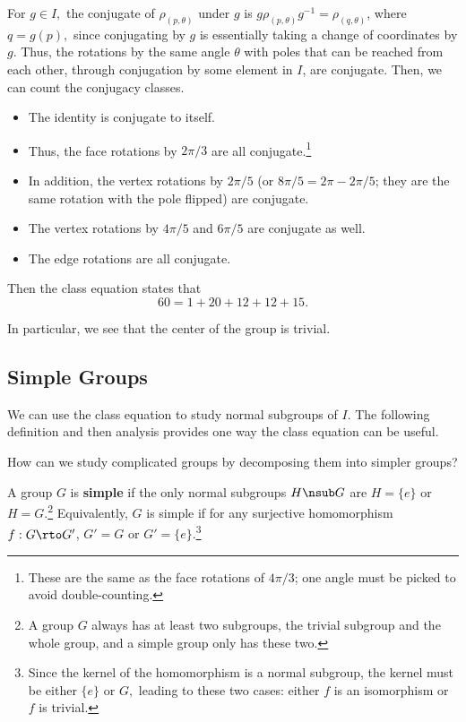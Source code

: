 For $g \in I,$ the conjugate of $\rho_{(p, \theta)}$ under $g$ is $g\rho_{(p, \theta)} g^{-1} = \rho_{(q, \theta)}$, where $q = g(p),$ since conjugating by $g$ is essentially taking a change of coordinates by $g.$ Thus, the rotations by the same angle $\theta$ with poles that can be reached from each other, through conjugation by some element in $I$, are conjugate. Then, we can count the conjugacy classes. 
\begin{itemize}
    \item The identity is conjugate to itself.
    
    \item Thus, the face rotations by $2\pi/3$ are all conjugate.\footnote{These are the same as the face rotations of $4\pi/3$; one angle must be picked to avoid double-counting.} 
    
    \item In addition, the vertex rotations by $2\pi/5$ (or $8\pi/5 = 2\pi - 2\pi/5$; they are the same rotation with the pole flipped) are conjugate.
    
    \item The vertex rotations by $4\pi/5$ and $6\pi/5$ are conjugate as well. 
    
    \item The edge rotations are all conjugate. 
\end{itemize}

Then the class equation states that 
\[
60 = 1 + 20 + 12 + 12 + 15.
\]

In particular, we see that the center of the group is trivial.

\subsection{Simple Groups}
We can use the class equation to study normal subgroups of $I.$ The following definition and then analysis provides one way the class equation can be useful.

\begin{qq}
How can we study complicated groups by decomposing them into simpler groups? 
\end{qq}

\begin{definition}
A group $G$ is \textbf{simple} if the only normal subgroups $H \nsub G$ are $H = \{e\}$ or $H = G.$\footnote{A group $G$ always has at least two subgroups, the trivial subgroup and the whole group, and a simple group only has these two.} Equivalently, $G$ is simple if for any surjective homomorphism $f: G \rto G'$, $G' = G$ or $G' = \{e\}.$\footnote{Since the kernel of the homomorphism is a normal subgroup, the kernel must be either $\{e\}$ or $G,$ leading to these two cases: either $f$ is an isomorphism or $f$ is trivial.}
\end{definition}

